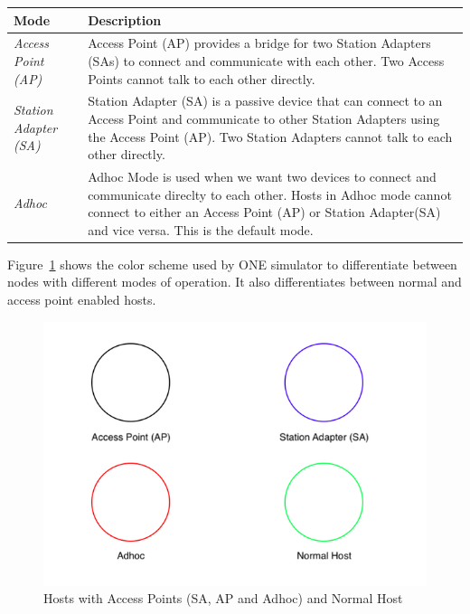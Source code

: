 	\begin{center}
	    \begin{tabular}{ | l | p{10.5cm} |}
    		\hline
    		\textbf{Mode} & \textbf{Description} \\ \hline
    		\textit{Access Point (AP)} & Access Point (AP) provides a bridge for two Station Adapters (SAs) to connect and communicate with each other. Two Access Points cannot talk to each other directly. \\ \hline
    		\textit{Station Adapter (SA)} & Station Adapter (SA) is a passive device that can connect to an Access Point and communicate to other Station Adapters using the Access Point (AP). Two Station Adapters cannot talk to each other directly. \\ \hline
    		\textit{Adhoc} & Adhoc Mode is used when we want two devices to connect and communicate direclty to each other. Hosts in Adhoc mode cannot connect to either an Access Point (AP) or Station Adapter(SA) and vice versa. This is the default mode.\\ \hline
    	\end{tabular}
	\end{center}
	\vspace{5mm}
	Figure~\ref{fig:aps1} shows the color scheme used by ONE simulator to differentiate between nodes with different modes of operation. It also differentiates between normal and access point enabled hosts.\newline
	\begin{figure}[h]
		\centering
		\includegraphics[scale=0.45]{./figures/aps-1}
		\caption{Hosts with Access Points (SA, AP and Adhoc) and Normal Host}
		\label{fig:aps1}
	\end{figure}
